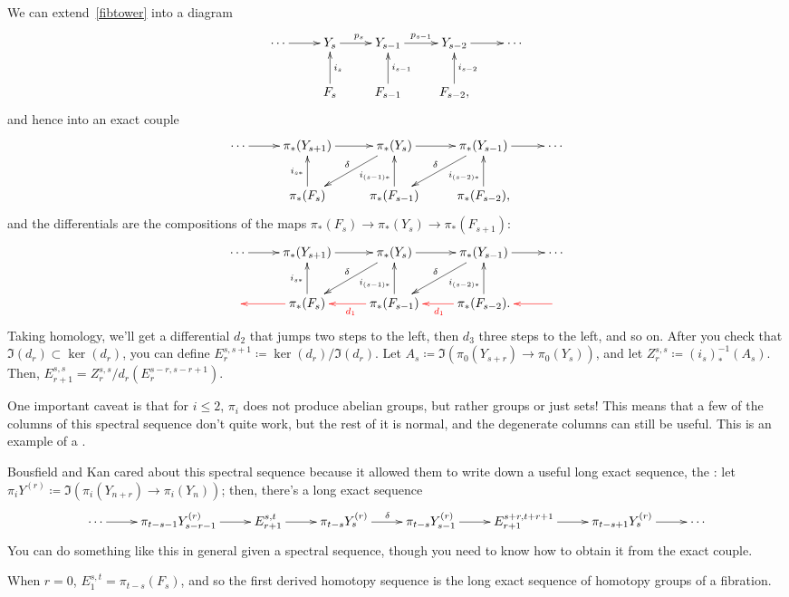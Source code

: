 We can extend~\eqref{fibtower} into a diagram
\[\xymatrix{
	\dotsb\ar[r] & Y_s\ar[r]^{p_s} & Y_{s-1}\ar[r]^{p_{s-1}} &Y_{s-2}\ar[r] & \dotsb\\
	& F_s\ar[u]_{i_s} & F_{s-1}\ar[u]_{i_{s-1}} & F_{s-2},\ar[u]_{i_{s-2}}
}\]
and hence into an exact couple
\[\xymatrix{
	\dotsb\ar[r] & \pi_*(Y_{s+1})\ar[r] & \pi_*(Y_s)\ar[r]\ar[dl]_\delta & \pi_*(Y_{s-1})\ar[dl]_\delta\ar[r] &
	\dotsb\\
	& \pi_*(F_{s})\ar[u]^{i_{s*}} & \pi_*(F_{s-1})\ar[u]^(0.4){i_{(s-1)*}} &
	\pi_*(F_{s-2}),\ar[u]^(0.4){i_{(s-2)*}}
}\]
and the differentials are the compositions of the maps $\pi_*(F_s)\to\pi_*(Y_s)\to \pi_*(F_{s+1})$:
\[\xymatrix{
	\dotsb\ar[r] & \pi_*(Y_{s+1})\ar[r] & \pi_*(Y_s)\ar[r]\ar[dl]_\delta & \pi_*(Y_{s-1})\ar[dl]_\delta\ar[r] &
	\dotsb\\
	& \pi_*(F_{s})\ar[u]^{i_{s*}}\ar@[red][l] & \pi_*(F_{s-1}) \ar[u]^(0.4){i_{(s-1)*}}
	\ar@[red][l]^{\textcolor{red}{d_1}} & \pi_*(F_{s-2}). \ar[u]^(0.4){i_{(s-2)*}}
	\ar@[red][l]^{\textcolor{red}{d_1}} &\ar@[red][l]
}\]
Taking homology, we'll get a differential $d_2$ that jumps two steps to the left, then $d_3$ three steps to the
left, and so on. After you check that $\Im(d_r)\subset\ker(d_r)$, you can define $E_r^{s,s+1}\coloneqq
\ker(d_r)/\Im(d_r)$. Let $A_s\coloneqq\Im(\pi_0(Y_{s+r})\to\pi_0(Y_s))$, and let $Z_r^{s,s}\coloneqq
(i_s)^{-1}_*(A_s)$. Then, $E_{r+1}^{s,s} = Z_r^{s,s} / d_r(E_r^{s-r, s-r+1})$.
\begin{rem}
One important caveat is that for $i\le 2$, $\pi_i$ does not produce abelian groups, but rather groups or just sets!
This means that a few of the columns of this spectral sequence don't quite work, but the rest of it is normal, and
the degenerate columns can still be useful. This is an example of a .
\end{rem}
Bousfield and Kan cared about this spectral sequence because it allowed them to write down a useful long exact
sequence, the : let $\pi_iY^{(r)}\coloneqq
\Im(\pi_i(Y_{n+r})\to\pi_i(Y_n))$; then, there's a long exact sequence
\[\xymatrix{
	\dotsb\ar[r] & \pi_{t-s-1}Y_{s-r-1}^{(r)}\ar[r] & E_{r+1}^{s,t}\ar[r] & \pi_{t-s}Y_s^{(r)}\ar[r]^\delta &
	\pi_{t-s}Y_{s-1}^{(r)}\ar[r] & E_{r+1}^{s+r, t+r+1}\ar[r] & \pi_{t-s+1}Y_s^{(r)}\ar[r] & \dotsb
}\]
You can do something like this in general given a spectral sequence, though you need to know how to obtain it from
the exact couple.
\begin{rem}
When $r = 0$, $E_1^{s,t} = \pi_{t-s}(F_s)$, and so the first derived homotopy sequence is the long exact sequence
of homotopy groups of a fibration.
\end{rem}
